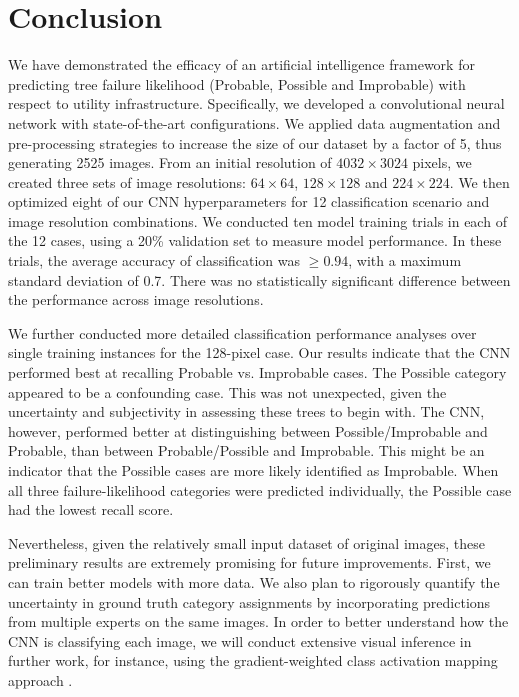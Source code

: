 \documentclass[Journal,letterpaper, SingleSpace, InsideFigs]{ascelike-new}
\begin{document}
\eject
\section{Conclusion}
We have demonstrated the efficacy of an artificial intelligence framework for predicting tree failure likelihood (Probable, Possible and Improbable) with respect to utility infrastructure. Specifically, we developed a convolutional neural network with state-of-the-art configurations.
We applied data augmentation and pre-processing strategies to increase the size of our dataset by a factor of 5, thus generating 2525 images.
From an initial resolution of $4032 \times 3024$ pixels, we created three sets of image resolutions: $64 \times 64$, $128 \times 128$ and $224 \times 224$.
We then optimized eight of our CNN hyperparameters for 12  classification scenario and image resolution combinations. 
We conducted ten model training trials in each of the 12 cases, using a 20\% validation set to measure model performance.
In these trials, the average accuracy of classification was $\geq 0.94$, with a maximum standard deviation of 0.7.
There was no statistically significant difference between the performance across image resolutions.

We further conducted more detailed classification performance analyses over single training instances for the 128-pixel case.
Our results indicate that the CNN performed best at recalling Probable vs. Improbable cases.
The Possible category appeared to be a confounding case.
This was not unexpected, given the uncertainty and subjectivity in assessing these trees to begin with.
The CNN, however, performed better at distinguishing between Possible/Improbable and Probable, than between Probable/Possible and Improbable.
This might be an indicator that the Possible cases are more likely identified as Improbable.
When all three failure-likelihood categories were predicted individually, the Possible case had the lowest recall score.

Nevertheless, given the relatively small input dataset of original images, these preliminary results are extremely promising for future improvements.
First, we can train better models with more data.
We also plan to rigorously quantify the uncertainty in ground truth category assignments by incorporating predictions from multiple experts on the same images.
In order to better understand how the CNN is classifying each image, we will conduct extensive visual inference in further work, for instance, using the gradient-weighted class activation mapping approach \cite{zeiler2014visualizing}.
\end{document}
